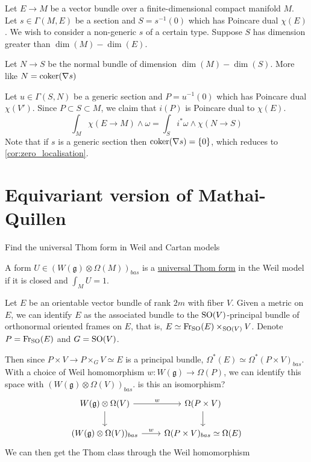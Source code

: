 Let $E\to M$ be a vector bundle over a finite-dimensional compact manifold  $M$.
Let $s\in\Gamma(M,E)$ be a section and  $S=s^{-1}(0)$ which has
Poincare dual $\chi(E)$. We wish to consider a non-generic $s$ of a certain
type. Suppose $S$ has dimension greater than
$\dim(M)-\dim(E)$. 

Let  $N\to S$ be the normal bundle of dimension
$\dim(M)-\dim(S)$.  More like $N = \operatorname{coker} (\nabla s)$

Let  $u\in\Gamma(S,N)$ be a generic section and
$P=u^{-1}(0)$ which has Poincare dual $\chi(V')$. Since  $P\subset S \subset M$,
we claim that $i(P)$ is Poincare dual to  $\chi(E)$.
\[
\int_M \chi(E\to M)\wedge \omega = \int_{S} i^*\omega \wedge \chi(N\to S)
\] 
Note that if $s$ is a generic section then  $\operatorname{coker} (\nabla s) = \{0\}$, which
reduces to \ref{cor:zero_localisation}.



\section{Equivariant version of Mathai-Quillen}
Find the universal Thom form in Weil and Cartan models
\begin{defn}
	A form $U\in (W(\mathfrak{g})\otimes \Omega(M))_{bas}$ is a
	\underline{universal Thom form} in the Weil model if it is closed and
	$\int_M U = 1$. 
\end{defn} 

Let $E$ be an orientable vector bundle of rank  $2m$ with fiber  $V$. Given a
metric on  $E$, we can identify  $E$ as the associated bundle to the
$\operatorname{SO}(V)$-principal bundle of orthonormal oriented frames on $E$, that is, $E
\simeq \operatorname{Fr}_{\operatorname{SO}}(E) \times_{\operatorname{SO}(V)} V$. Denote $P=\operatorname{Fr}_{\operatorname{SO}}(E)$ and $G=\operatorname{SO}(V)$.

Then since  $P\times V \to P\times_G V \simeq E$ is a principal bundle,
$\Omega^*(E)\simeq \Omega^*(P\times V)_{bas}$. 
With a choice of Weil homomorphism $w:W(\mathfrak{g}) \to \Omega(P)$, we can
identify this space with $(W(\mathfrak{g})\otimes\Omega(V))_{bas}$. 
is this an isomorphism?
\[\begin{tikzcd}[column sep=2.25em]
		{W(\mathfrak{g})\otimes\Omega(V)} & {\Omega(P\times V)} \\
			{(W(\mathfrak{g})\otimes\Omega(V))_{bas}} & {\Omega(P\times
			V)_{bas}\simeq\Omega(E)}
				\arrow["w", from=1-1, to=1-2]
					\arrow[from=1-1, to=2-1]
						\arrow[from=1-2, to=2-2]
							\arrow["w", from=2-1, to=2-2]
\end{tikzcd}\]
We can then get the Thom class through the Weil homomorphism
